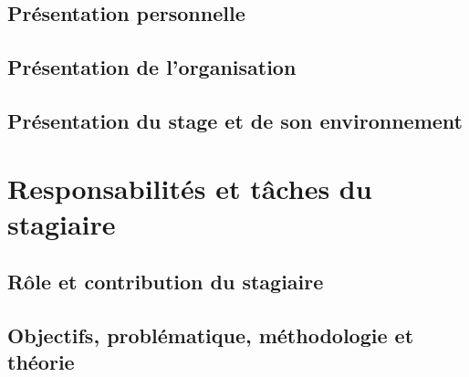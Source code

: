 \documentclass[12pt]{article} 	%
\begin{document}
\subsection{Présentation personnelle}

\subsection{Présentation de l'organisation}

\subsection{Présentation du stage et de son environnement}


\newpage
\section{Responsabilités et tâches du stagiaire}

\subsection{Rôle et contribution du stagiaire}

\subsection{Objectifs, problématique, méthodologie et théorie}
\end{document}
